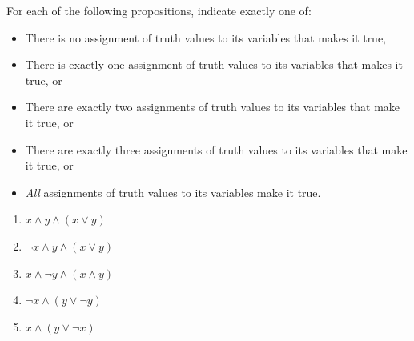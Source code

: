 
For each of the following propositions, indicate exactly one of:

\begin{itemize}
    \item There is no assignment of truth values to its variables that makes it true,
    \item There is exactly one assignment of truth values to its variables that makes it true, or
    \item There are exactly two assignments of truth values to its variables that make it true, or
    \item There are exactly three assignments of truth values to its variables that make it true, or
    \item \emph{All} assignments of truth values to its variables make it true.
\end{itemize}

\begin{enumerate}
    \item $x \land y \land (x \lor y)$
    \item $\lnot x \land y \land (x \lor y)$
    \item $x \land \lnot y \land (x \land y)$
    \item $\lnot x \land (y \lor \lnot y)$
    \item $x \land (y \lor \lnot x)$
\end{enumerate}